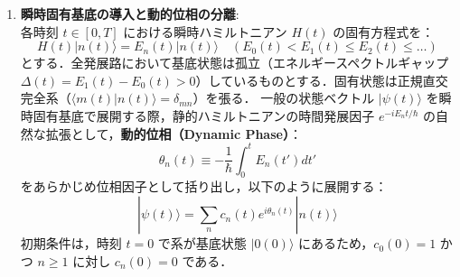 \documentclass[11pt,a4paper,oneside,openany]{ltjsbook}
\theoremstyle{definition}
\theoremstyle{plain}
\theoremstyle{remark}
\newcommand{\ket}[1]{|#1\rangle}
\newcommand{\braket}[2]{\langle#1|#2\rangle}
\begin{document}
\begin{insightbox}
\begin{enumerate}[label=\textbf{Step \arabic* :}, leftmargin=*]
    \item \textbf{瞬時固有基底の導入と動的位相の分離}:\\
    各時刻 $t \in [0, T]$ における瞬時ハミルトニアン $H(t)$ の固有方程式を：
    \begin{equation}
        H(t) \ket{n(t)} = E_n(t) \ket{n(t)} \quad (E_0(t) < E_1(t) \le E_2(t) \le \dots)
    \end{equation}
    とする．全発展路において基底状態は孤立（エネルギースペクトルギャップ $\Delta(t) = E_1(t) - E_0(t) > 0$）しているものとする．固有状態は正規直交完全系（$\braket{m(t)}{n(t)} = \delta_{mn}$）を張る．
    一般の状態ベクトル $\ket{\psi(t)}$ を瞬時固有基底で展開する際，静的ハミルトニアンの時間発展因子 $e^{-i E_n t / \hbar}$ の自然な拡張として，\textbf{動的位相（Dynamic Phase）}：
    \begin{equation}
        \theta_n(t) \equiv -\frac{1}{\hbar} \int_0^t E_n(t') dt'
    \end{equation}
    をあらかじめ位相因子として括り出し，以下のように展開する：
    \begin{equation}
        \ket{\psi(t)} = \sum_n c_n(t) e^{i \theta_n(t)} \ket{n(t)}
    \end{equation}
    初期条件は，時刻 $t=0$ で系が基底状態 $\ket{0(0)}$ にあるため，$c_0(0) = 1$ かつ $n \ge 1$ に対し $c_n(0) = 0$ である．


\end{enumerate}
\end{insightbox}
\end{document}
